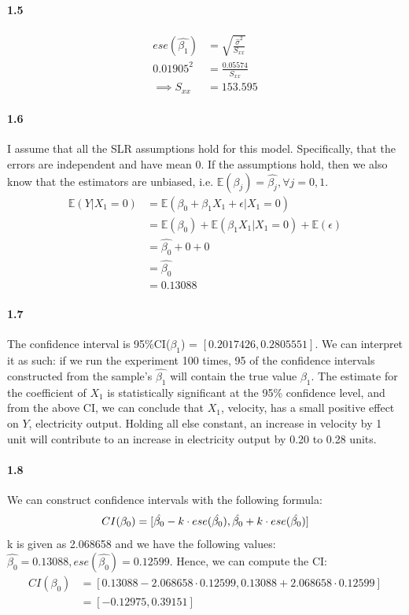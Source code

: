 \documentclass[11pt,letterpaper]{article}
\begin{document}
		\paragraph*{1.5} 
		\begin{align*}
			ese(\hat{\beta_1}) &= \sqrt{\frac{\hat{\sigma}^2}{S_{xx}}} \\
			0.01905^2 &= \frac{0.05574}{S_{xx}} \\
			\implies S_{xx} &= 153.595
		\end{align*}
		 
		\paragraph*{1.6} I assume that all the SLR assumptions hold for this model. Specifically, that the errors are independent and have mean 0. If the assumptions hold, then we also know that the estimators are unbiased, i.e. \(\mathbb{E}(\beta_j) = \hat{\beta_j} , \forall j=0,1\).
		\begin{align*}
			\mathbb{E}(Y|X_1 = 0) &= \mathbb{E}(\beta_0 + \beta_1 X_1 + \epsilon | X_1 = 0) \\
				&= \mathbb{E}(\beta_0) + \mathbb{E}(\beta_1X_1 | X_1 = 0) + \mathbb{E}(\epsilon) \\
				&= \hat{\beta_0} + 0 + 0 \\ 
				&= \hat{\beta_0} \\ 
				&= 0.13088
		\end{align*}	 
		
		\paragraph*{1.7} The confidence interval is 95\%CI(\(\beta_1\)) = \([0.2017426, 0.2805551]\). We can interpret it as such: if we run the experiment 100 times, 95 of the confidence intervals constructed from the sample's \(\hat{\beta_1}\) will contain the true value \(\beta_1\). The estimate for the coefficient of \(X_1\) is statistically significant at the 95\% confidence level, and from the above CI, we can conclude that \(X_1\), velocity, has a small positive effect on \(Y\), electricity output. Holding all else constant, an increase in velocity by 1 unit will contribute to an increase in electricity output by 0.20 to 0.28 units. 		
		
		\paragraph*{1.8} We can construct confidence intervals with the following formula:
		\begin{equation*}
			CI(\beta_0) = [\hat{\beta_0} - k \cdot ese(\hat{\beta_0}), \hat{\beta_0} + k \cdot ese(\hat{\beta_0})] \\ 
		\end{equation*}
		k is given as 2.068658 and we have the following values: \(\hat{\beta_0} = 0.13088, ese(\hat{\beta_0}) = 0.12599\).
		Hence, we can compute the CI:
		\begin{align*}
			CI(\beta_0) &= [0.13088 - 2.068658 \cdot 0.12599, 0.13088 + 2.068658 \cdot 0.12599] \\ 
				&= [-0.12975, 0.39151]
		\end{align*}
	
\end{document}
